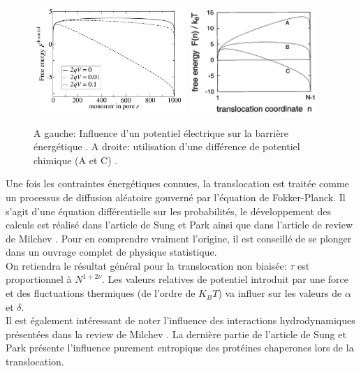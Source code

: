 \documentclass[a4paper,11pt]{article}
\begin{document}
\begin{figure}[H]
\begin{center}
\includegraphics[width=0.52\textwidth]{transelec.jpg} \includegraphics[width=0.42\textwidth]{transpotchim.jpg}

\caption{A gauche: Influence d'un potentiel électrique sur la barrière énergétique \cite{these}.
A droite: utilisation d'une différence de potentiel chimique (A et C) \cite{sung}.}
\label{transpot}
\end{center}
\end{figure}

Une fois les contraintes énergétiques connues, la translocation est traitée comme un processus de diffusion aléatoire gouverné par l'équation de Fokker-Planck. Il s'agit d'une équation différentielle sur les probabilités, le développement des calculs est réalisé dans l'article de Sung et Park \cite{sung} ainsi que dans l'article de review de Milchev \cite{milchev}. Pour en comprendre vraiment l'origine, il est conseillé de se plonger dans un ouvrage complet de physique statistique.\\

On retiendra le résultat général pour la translocation non biaisée: $\tau$ est proportionnel à $N^{1+2\nu}$. Les valeurs relatives de potentiel introduit par une force et des fluctuations thermiques (de l'ordre de $K_B T$) va influer sur les valeurs de $\alpha$ et $\delta$\cite{milchev,sung}.\\

Il est également intéressant de noter l'influence des interactions hydrodynamiques présentées dans la review de Milchev \cite{milchev}. La dernière partie de l'article de Sung et Park \cite{sung} présente l'influence purement entropique des protéines chaperones lors de la translocation.\\
\end{document}

